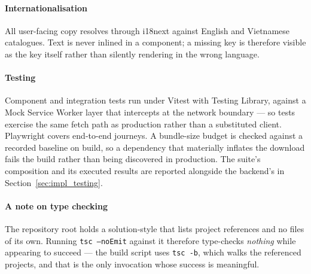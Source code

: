 \paragraph{Internationalisation}
All user-facing copy resolves through i18next against English and Vietnamese catalogues. Text is never inlined in a component; a missing key is therefore visible as the key itself rather than silently rendering in the wrong language.

\paragraph{Testing}
Component and integration tests run under Vitest with Testing Library, against a Mock Service Worker layer that intercepts at the network boundary --- so tests exercise the same fetch path as production rather than a substituted client. Playwright covers end-to-end journeys. A bundle-size budget is checked against a recorded baseline on build, so a dependency that materially inflates the download fails the build rather than being discovered in production. The suite's composition and its executed results are reported alongside the backend's in Section~\ref{sec:impl_testing}.

\paragraph{A note on type checking}
The repository root holds a solution-style  that lists project references and no files of its own. Running \texttt{tsc --noEmit} against it therefore type-checks \emph{nothing} while appearing to succeed --- the build script uses \texttt{tsc -b}, which walks the referenced projects, and that is the only invocation whose success is meaningful.

